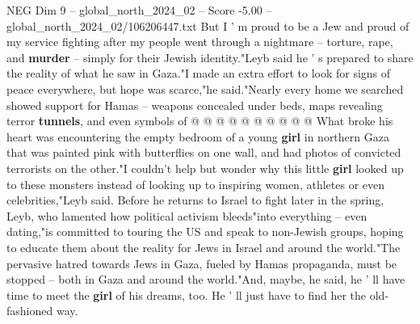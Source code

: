 \begin{textsample}{NEG Dim 9 – global\_north\_2024\_02 – Score -5.00 – global\_north\_2024\_02/106206447.txt}
But I ' m proud to be a Jew and proud of my service fighting after my people went through a nightmare -- torture, rape, and \textbf{murder} -- simply for their Jewish identity."Leyb said he ' s prepared to share the reality of what he saw in Gaza."I made an extra effort to look for signs of peace everywhere, but hope was scarce,"he said."Nearly every home we searched showed support for Hamas -- weapons concealed under beds, maps revealing terror \textbf{tunnels}, and even symbols of @ @ @ @ @ @ @ @ @ @ What broke his heart was encountering the empty bedroom of a young \textbf{girl} in northern Gaza that was painted pink with butterflies on one wall, and had photos of convicted terrorists on the other."I couldn't help but wonder why this little \textbf{girl} looked up to these monsters instead of looking up to inspiring women, athletes or even celebrities,"Leyb said.
Before he returns to Israel to fight later in the spring, Leyb, who lamented how political activism bleeds"into everything -- even dating,"is committed to touring the US and speak to non-Jewish groups, hoping to educate them about the reality for Jews in Israel and around the world."The pervasive hatred towards Jews in Gaza, fueled by Hamas propaganda, must be stopped -- both in Gaza and around the world."And, maybe, he said, he ' ll have time to meet the \textbf{girl} of his dreams, too.
He ' ll just have to find her the old-fashioned way.

\end{textsample}
